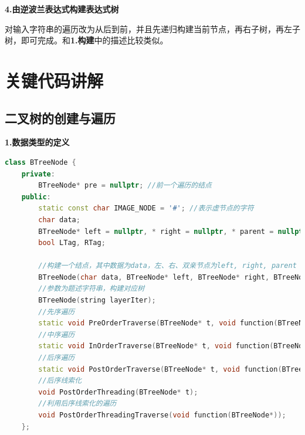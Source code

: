 \documentclass[UTF8]{article}
\begin{document}
	\textbf{4.由逆波兰表达式构建表达式树}\par
	对输入字符串的遍历改为从后到前，并且先递归构建当前节点，再右子树，再左子树，即可完成。和\textbf{1.构建}中的描述比较类似。
	
	
	\section{关键代码讲解}
	\subsection{二叉树的创建与遍历}
	\textbf{1.数据类型的定义}\par
	\begin{lstlisting}[language=C++]
	class BTreeNode {
	private:
		BTreeNode* pre = nullptr; //前一个遍历的结点
	public:
		static const char IMAGE_NODE = '#'; //表示虚节点的字符
		char data;
		BTreeNode* left = nullptr, * right = nullptr, * parent = nullptr;
		bool LTag, RTag;
		
		//构建一个结点，其中数据为data，左、右、双亲节点为left, right, parent
		BTreeNode(char data, BTreeNode* left, BTreeNode* right, BTreeNode* parent);
		//参数为题述字符串，构建对应树
		BTreeNode(string layerIter);
		//先序遍历
		static void PreOrderTraverse(BTreeNode* t, void function(BTreeNode*));
		//中序遍历
		static void InOrderTraverse(BTreeNode* t, void function(BTreeNode*));
		//后序遍历
		static void PostOrderTraverse(BTreeNode* t, void function(BTreeNode*));
		//后序线索化
		void PostOrderThreading(BTreeNode* t);
		//利用后序线索化的遍历
		void PostOrderThreadingTraverse(void function(BTreeNode*));
	};
	\end{lstlisting}\par
	
\end{document}

